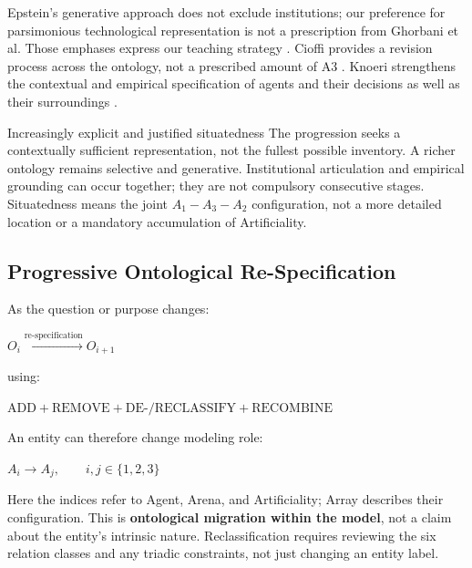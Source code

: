 \documentclass[11pt,a4paper]{article}
\newenvironment{fitdisplay}{\par\medskip\noindent\begin{lrbox}{\displaybox}$\displaystyle}{%
$\end{lrbox}\makebox[\linewidth][c]{\ifdim\wd\displaybox>\linewidth\resizebox{\linewidth}{!}{\usebox{\displaybox}}\else\usebox{\displaybox}\fi}\par\medskip}
\begin{document}
Epstein's generative approach does not exclude institutions; our preference for parsimonious technological representation is not a prescription from Ghorbani et al. Those emphases express our teaching strategy \cite{epstein,ghorbani}. Cioffi provides a revision process across the ontology, not a prescribed amount of A3 \cite{cioffi}. Knoeri strengthens the contextual and empirical specification of agents and their decisions as well as their surroundings \cite{knoeri}.

\begin{principle}{Increasingly explicit and justified situatedness}
The progression seeks a contextually sufficient representation, not the fullest possible inventory. A richer ontology remains selective and generative. Institutional articulation and empirical grounding can occur together; they are not compulsory consecutive stages. Situatedness means the joint $A_1-A_3-A_2$ configuration, not a more detailed location or a mandatory accumulation of Artificiality.
\end{principle}

\subsection{Progressive Ontological Re-Specification}

As the question or purpose changes:

\begin{fitdisplay}
\boxed{
O_i
\xrightarrow{\text{re-specification}}
O_{i+1}
}
\end{fitdisplay}

using:

\begin{fitdisplay}
\boxed{
\text{ADD}
+
\text{REMOVE}
+
\text{DE-/RECLASSIFY}
+
\text{RECOMBINE}
}
\end{fitdisplay}

An entity can therefore change modeling role:

\begin{fitdisplay}
\boxed{
A_i\rightarrow A_j,\qquad i,j\in\{1,2,3\}
}
\end{fitdisplay}

Here the indices refer to Agent, Arena, and Artificiality; Array describes their configuration. This is \textbf{ontological migration within the model}, not a claim about the entity's intrinsic nature. Reclassification requires reviewing the six relation classes and any triadic constraints, not just changing an entity label.
\end{document}
